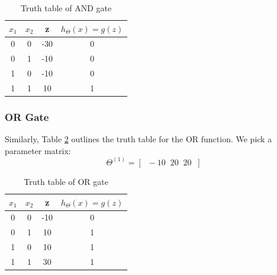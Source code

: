             \begin{table}
                \begin{center}
                    \begin{tabular}[htbp]{|c|c||c|c|}
                        \hline
                        $x_1$ & $x_2$ & z & $h_\Theta (x) = g(z)$ \\
                        \hline
                        \hline
                        0   &   0   &   -30     &   0\\
                        0   &   1   &   -10     &   0\\
                        1   &   0   &   -10     &   0\\
                        1   &   1   &    10     &   1\\
                        \hline
                    \end{tabular}
                \end{center}
                \caption{Truth table of AND gate}
                \label{tab:AND-gate}
            \end{table}


        \subsubsection{OR Gate}

        Similarly, Table \ref{tab:OR-gate} outlines the truth table for the OR function. We pick a parameter matrix:
            \[
                \Theta^{(1)} = [\;\;-10 \;\; 20 \;\; 20 \;\;]
            \] 
          

            \begin{table}
                \begin{center}
                    \begin{tabular}[htbp]{|c|c||c|c|}
                        \hline
                        $x_1$ & $x_2$ & z & $h_\Theta (x) = g(z)$ \\
                        \hline
                        \hline
                        0   &   0   &   -10     &   0\\
                        0   &   1   &    10     &   1\\
                        1   &   0   &    10     &   1\\
                        1   &   1   &    30     &   1\\
                        \hline
                    \end{tabular}
                \end{center}
                \caption{Truth table of OR gate}
                \label{tab:OR-gate}
            \end{table}




